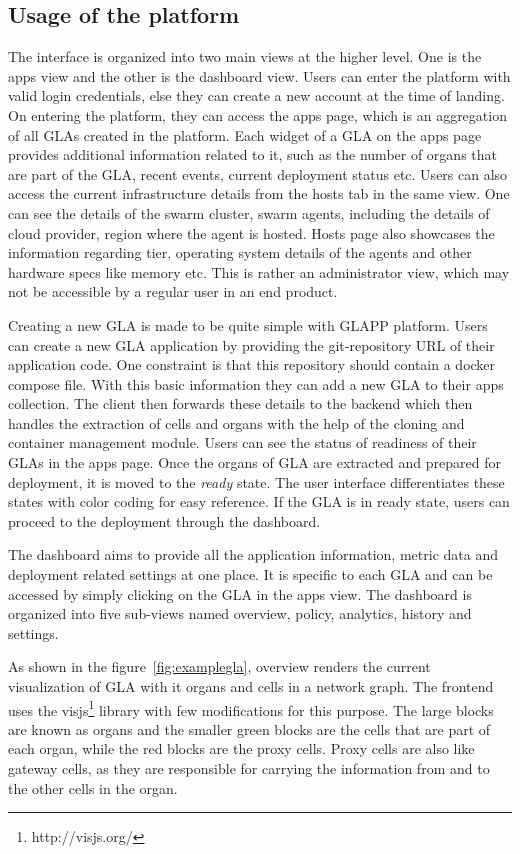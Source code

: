\documentclass{seal_thesis}
\begin{document}
\subsection{Usage of the platform}

The interface is organized into two main views at the higher level. 
One is the apps view and the other is the dashboard view. 
Users can enter the platform with valid login credentials, else they can create a new account at the time of landing. 
On entering the platform, they can access the apps page, which is an aggregation of all GLAs created in the platform. 
Each widget of a GLA on the apps page provides additional information related to it, such as the number of organs that are part of the GLA, recent events, current deployment status etc. 
Users can also access the current infrastructure details from the hosts tab in the same view. 
One can see the details of the swarm cluster, swarm agents, including the details of cloud provider, region where the agent is hosted. 
Hosts page also showcases the information regarding tier, operating system details of the agents and other hardware specs like memory etc.
This is rather an administrator view, which may not be accessible by a regular user in an end product.

Creating a new GLA is made to be quite simple with GLAPP platform. 
Users can create a new GLA application by providing the git-repository URL of their application code. 
One constraint is that this repository should contain a docker compose file. 
With this basic information they can add a new GLA to their apps collection.
The client then forwards these details to the backend which then handles the extraction of cells and organs with the help of the cloning and container management module. 
Users can see the status of readiness of their GLAs in the apps page. 
Once the organs of GLA are extracted and prepared for deployment, it is moved to the \textit{ready} state. 
The user interface differentiates these states with color coding for easy reference.
If the GLA is in ready state, users can proceed to the deployment through the dashboard.

The dashboard aims to provide all the application information, metric data and deployment related settings at one place. 
It is specific to each GLA and can be accessed by simply clicking on the GLA in the apps view. 
The dashboard is organized into five sub-views named overview, policy, analytics, history and settings. 

As shown in the figure~\ref{fig:examplegla}, overview renders the current visualization of GLA with it organs and cells in a network graph. 
The frontend uses the visjs\footnote{http://visjs.org/} library with few modifications for this purpose. 
The large blocks are known as organs and the smaller green blocks are the cells that are part of each organ, while the red blocks are the proxy cells. 
Proxy cells are also like gateway cells, as they are responsible for carrying the information from and to the other cells in the organ.
\end{document}
